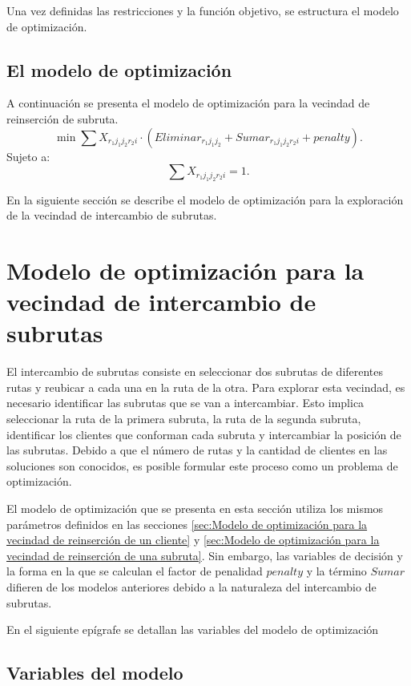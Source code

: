 \documentclass[12pt]{report}
\begin{document}
	Una vez definidas las restricciones y la función objetivo, se estructura el modelo de optimización.

	\subsection{El modelo de optimización}
	\label{sec:El Modelo}


	A continuación se presenta el modelo de optimización para la vecindad de reinserción de subruta.
	\[
	\min \sum X_{r_1j_1j_2r_2i} \cdot (Eliminar_{r_1j_1j_2} + Sumar_{r_1j_1j_2r_2i} + penalty).
	\]
	Sujeto a:
	\[
	\sum  X_{r_1j_1j_2r_2i} = 1.
      \]

	En la siguiente sección se describe el modelo de optimización para la exploración de la vecindad de intercambio de subrutas.

	\section{Modelo de optimización para la vecindad de intercambio de subrutas}
	\label{sec:Modelo de optimización para la vecindad de intercambio de subrutas}

	El intercambio de subrutas consiste en seleccionar dos subrutas de diferentes rutas y reubicar a cada una en la ruta de la otra. Para explorar esta vecindad, es necesario identificar las subrutas que se van a intercambiar. Esto implica seleccionar la ruta de la primera subruta, la ruta de la segunda subruta, identificar los clientes que conforman cada subruta y intercambiar la posición de las subrutas. Debido a que el número de rutas y la cantidad de clientes en las soluciones son conocidos, es posible formular este proceso como un problema de optimización.

	El modelo de optimización que se presenta en esta sección utiliza los mismos parámetros definidos en las secciones \ref{sec:Modelo de optimización para la vecindad de reinserción de un cliente} y \ref{sec:Modelo de optimización para la vecindad de reinserción de una subruta}. Sin embargo, las variables de decisión y la forma en la que se calculan el factor de penalidad $penalty$ y la término $Sumar$ difieren de los modelos anteriores debido a la naturaleza del intercambio de subrutas.


	En el siguiente epígrafe se detallan las variables del modelo de optimización
	\subsection{Variables del modelo}
\end{document}

